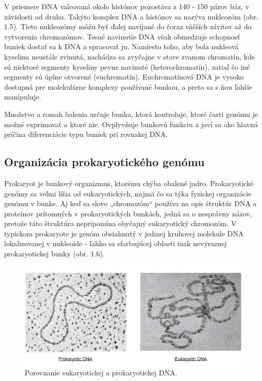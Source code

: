 V priemere DNA valcovaná okolo histónov pozostáva z 140 - 150 párov báz, v závislosti od druhu.
Takýto komplex DNA a histónov sa nazýva nukleozóm (obr. 1.5).
Tieto nukleozómy môžu byť ďalej navíjané do čoraz väčších závitov až do vytvorenia chromozómov.
Tesné navinutie DNA však obmedzuje schopnosť buniek dostať sa k DNA a spracovať ju.
Namiesto toho, aby bola nukleová kyselina neustále zvinutá, nachádza sa zvyčajne v stave zvanom chromatín, kde sú niektoré segmenty kyseliny pevne navinuté (heterochromatín), zatiaľ čo iné segmenty sú úplne otvorené (euchromatín).
Euchromatínová DNA je vysoko dostupná pre molekulárne komplexy používané bunkou, a preto sa s ňou ľahšie manipuluje.

Množstvo a rozsah balenia určuje bunka, ktorá kontroluje, ktoré časti genómu je možné exprimovať a ktoré nie.
Ovplyvňuje bunkovú funkciu a javí sa ako hlavná príčina diferenciácie typu buniek pri rovnakej DNA.

\subsection{Organizácia prokaryotického genómu}
Prokaryot je bunkový organizmus, ktorému chýba obalené jadro.
Prokaryotické genómy sa veľmi líšia od eukaryotických, najmä čo sa týka fyzickej organizácie genómu v bunke.
Aj keď sa slovo „chromozóm“ používa na opis štruktúr DNA a proteínov prítomných v prokaryotických bunkách, jedná sa o nesprávny názov, pretože táto štruktúra nepripomína obyčajný eukaryotický chromozóm.
V typickom prokaryote je genóm obsiahnutý v jedinej kruhovej molekule DNA lokalizovanej v nukleoide - ľahko sa sfarbujúcej oblasti inak nevýraznej prokaryotickej bunky (obr. 1.6).

\begin{figure}[!ht]
	\centering
	\includegraphics[width=\textwidth]{figures/pro-vs-eu-dna_med.jpeg}
	\caption{Porovnanie eukaryotickej a prokaryotickej DNA.\label{o:latex_friendly_zone}}
\end{figure}

